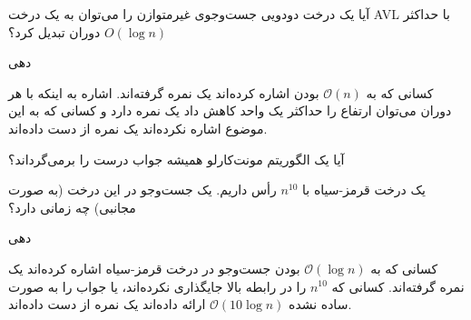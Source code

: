 


آیا یک درخت دودویی جست‌وجوی غیرمتوازن را می‌توان به یک درخت AVL با حداکثر $O(\log n)$ دوران تبدیل کرد؟


‌دهی{
 کسانی که به $\mathcal{O}(n)$ بودن اشاره کرده‌اند یک نمره گرفته‌اند.
 اشاره به اینکه با هر دوران می‌توان ارتفاع را حداکثر یک واحد کاهش داد یک نمره دارد و کسانی که به این موضوع اشاره نکرده‌اند یک نمره از دست داده‌اند.

}


آیا یک الگوریتم مونت‌کارلو همیشه جواب درست را برمی‌گرداند؟


یک درخت قرمز-سیاه با $n^{10}$ رأس داریم. یک جست‌وجو در این درخت (به صورت مجانبی) چه زمانی دارد؟


‌دهی{
 کسانی که به $\mathcal{O}(\log n)$ بودن جست‌و‌جو در درخت قرمز-سیاه اشاره کرده‌اند یک نمره گرفته‌اند.
 کسانی که $n^{10}$ را در رابطه بالا جایگذاری نکرده‌اند، یا جواب را به صورت ساده نشده $\mathcal{O}(10 \log n)$  
ارائه داده‌اند یک نمره از دست داده‌اند.


}

